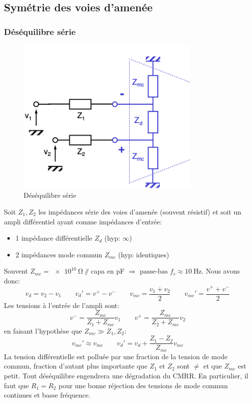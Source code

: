 \subsection{Symétrie des voies d'amenée}
\subsubsection{Déséquilibre série}
\begin{figure}[H] 
	\centering 
	\includegraphics[width=0.8\textwidth,height=10\baselineskip,keepaspectratio]{ch3/image17} 
	\caption{Déséquilibre série} 
\end{figure}
Soit \(Z_1, Z_2\) les impédances série des voies d'amenée (souvent résistif) et soit un ampli différentiel ayant comme impédances d'entrée:
\begin{itemize}
	\item 1 impédance différentielle \(Z_d\) (hyp: \(\infty\))
	\item 2 impédances mode commun \(Z_{mc}\) (hyp: identiques)
\end{itemize}
Souvent \(Z_{mc} = \SI{e10}{\ohm}\)  \(\parallelsum\) capa en \si{\pico\farad} \(\Rightarrow \text{ passe-bas }f_c\approx \SI{10}{\hertz}\). Nous avons donc:
\[v_d = v_2-v_1\qquad v_d'=v^+-v^-\qquad v_{mc}=\frac{v_1+v_2}{2}\qquad v_{mc}'=\frac{v^++v^-}{2}\]
Les tensions à l'entrée de l'ampli sont:
\[v^-=\frac{Z_{mc}}{Z_1+Z_{mc}}v_1\qquad v^+=\frac{Z_{mc}}{Z_2+Z_{mc}}v_2\]
en faisant l'hypothèse que \(Z_{mc}\gg Z_1, Z_2\):
\[v_{mc}'\approx v_{mc}\qquad v_d'=v_d+\frac{Z_1-Z_2}{Z_{mc}}v_{mc}\]
La tension différentielle est polluée par une fraction de la tension de mode commun, fraction d'autant plus importante que \(Z_1\text{ et }Z_2\) sont \(\neq\) et que \(Z_{mc}\) est petit. Tout déséquilibre engendrera une dégradation du CMRR. En particulier, il faut que \(R_1=R_2\) pour une bonne réjection des tensions de mode commun continues et basse fréquence.
